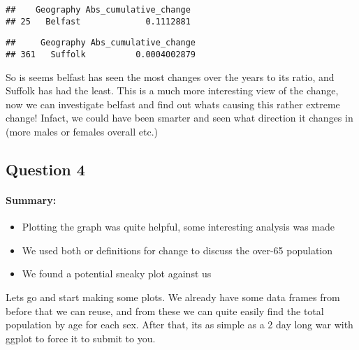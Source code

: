 \documentclass[]{article}
\newenvironment{Shaded}{\begin{snugshade}}{\end{snugshade}}
\newcommand{\KeywordTok}[1]{\textcolor[rgb]{0.13,0.29,0.53}{\textbf{#1}}}
\newcommand{\OperatorTok}[1]{\textcolor[rgb]{0.81,0.36,0.00}{\textbf{#1}}}
\newcommand{\NormalTok}[1]{#1}
\providecommand{\tightlist}{%
  \setlength{\itemsep}{0pt}\setlength{\parskip}{0pt}}
\let\oldparagraph\paragraph
\renewcommand{\paragraph}[1]{\oldparagraph{#1}\mbox{}}
\begin{document}
\begin{verbatim}
##    Geography Abs_cumulative_change
## 25   Belfast             0.1112881
\end{verbatim}

\begin{Shaded}
\end{Shaded}

\begin{verbatim}
##     Geography Abs_cumulative_change
## 361   Suffolk          0.0004002879
\end{verbatim}

So is seems belfast has seen the most changes over the years to its
ratio, and Suffolk has had the least. This is a much more interesting
view of the change, now we can investigate belfast and find out whats
causing this rather extreme change! Infact, we could have been smarter
and seen what direction it changes in (more males or females overall
etc.)

\subsection{Question 4}\label{question-4}

\paragraph{Summary:}\label{summary-3}

\begin{itemize}
\tightlist
\item
  Plotting the graph was quite helpful, some interesting analysis was
  made
\item
  We used both or definitions for change to discuss the over-65
  population
\item
  We found a potential sneaky plot against us
\end{itemize}

Lets go and start making some plots. We already have some data frames
from before that we can reuse, and from these we can quite easily find
the total population by age for each sex. After that, its as simple as a
2 day long war with ggplot to force it to submit to you.
\end{document}
